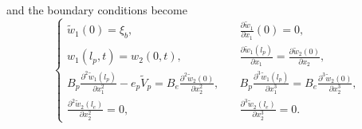 \documentclass{elsarticle}
\begin{document}
and the boundary conditions become
\begin{equation}
    \left\{\begin{aligned}
        \tilde{w}_1(0) = \xi_b , &\quad \frac{\partial \tilde{w}_1}{\partial x_1} (0) = 0, \\
        w_1(l_p,t) = w_2(0,t), &\quad \frac{\partial \tilde{w}_1(l_p)}{\partial x_1} = \frac{\partial \tilde{w}_2(0)}{\partial x_2}, \\
        B_p \frac{\partial^2 \tilde{w}_1(l_p)}{\partial x_1^2} - e_p \tilde{V}_p = B_e \frac{\partial^2 \tilde{w}_2(0)}{\partial x_2^2} , &\quad B_p \frac{\partial^3 \tilde{w}_1(l_p)}{\partial x_1^3} = B_e \frac{\partial^3 \tilde{w}_2(0)}{\partial x_2^3}, \\
        \frac{\partial^2 \tilde{w}_2(l_e)}{\partial x_2^2} = 0 , &\quad \frac{\partial^3 \tilde{w}_2(l_e)}{\partial x_2^3} = 0.
    \end{aligned}\right.
    \label{eq:eq_boundary_conditions_original}
\end{equation}
\end{document}
